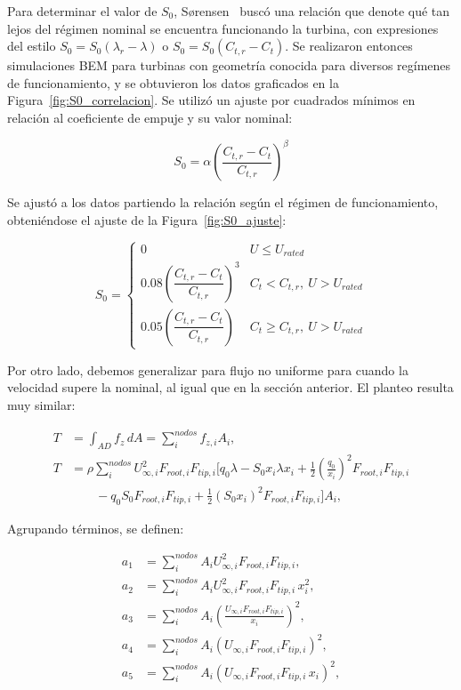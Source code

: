 Para determinar el valor de $S_0$, Sørensen~\cite{sorensen2023} buscó una relación que denote qué tan lejos del régimen nominal se encuentra funcionando la turbina, con expresiones del estilo $S_0 = S_0(\lambda_r - \lambda)$ o $S_0 = S_0(C_{t,r} - C_t)$. Se realizaron entonces simulaciones BEM para turbinas con geometría conocida para diversos regímenes de funcionamiento, y se obtuvieron los datos graficados en la Figura~\ref{fig:S0_correlacion}. Se utilizó un ajuste por cuadrados mínimos en relación al coeficiente de empuje y su valor nominal:

\begin{equation}
S_0 = \alpha\left(\frac{C_{t,r} - C_t}{C_{t,r}}\right)^\beta
\label{eq:genanalytic_S0_ajuste}
\end{equation}

Se ajustó a los datos partiendo la relación según el régimen de funcionamiento, obteniéndose el ajuste de la Figura~\ref{fig:S0_ajuste}:

\begin{equation}
S_0 =
\begin{cases}
0 & U \leq U_{rated} \\[4pt]
0.08\left(\dfrac{C_{t,r} - C_t}{C_{t,r}}\right)^3 & C_t < C_{t,r},\ U > U_{rated} \\[8pt]
0.05\left(\dfrac{C_{t,r} - C_t}{C_{t,r}}\right) & C_t \geq C_{t,r},\ U > U_{rated}
\end{cases}
\label{eq:genanalytic_S0_piecewise}
\end{equation}

Por otro lado, debemos generalizar para flujo no uniforme para cuando la velocidad supere la nominal, al igual que en la sección anterior. El planteo resulta muy similar:

\begin{align}
T &= \int_{AD} f_z\, dA = \sum_{i}^{nodos} f_{z,i}A_i, \label{eq:genanalytic_T1}\\
T &= \rho\sum_{i}^{nodos} U_{\infty,i}^2 F_{root,i}F_{tip,i}\Big[q_0\lambda - S_0 x_i\lambda x_i + \frac{1}{2}\left(\frac{q_0}{x_i}\right)^2 F_{root,i}F_{tip,i} \nonumber\\
&\qquad - q_0 S_0 F_{root,i}F_{tip,i} + \frac{1}{2}\left(S_0 x_i\right)^2 F_{root,i}F_{tip,i}\Big]A_i, \label{eq:genanalytic_T2}
\end{align}

Agrupando términos, se definen:

\begin{align}
a_1 &= \sum_{i}^{nodos} A_i U_{\infty,i}^2 F_{root,i}F_{tip,i}, \\
a_2 &= \sum_{i}^{nodos} A_i U_{\infty,i}^2 F_{root,i}F_{tip,i}\, x_i^2, \\
a_3 &= \sum_{i}^{nodos} A_i \left(\frac{U_{\infty,i}F_{root,i}F_{tip,i}}{x_i}\right)^2, \\
a_4 &= \sum_{i}^{nodos} A_i \left(U_{\infty,i}F_{root,i}F_{tip,i}\right)^2, \\
a_5 &= \sum_{i}^{nodos} A_i \left(U_{\infty,i}F_{root,i}F_{tip,i}\, x_i\right)^2,
\end{align}

